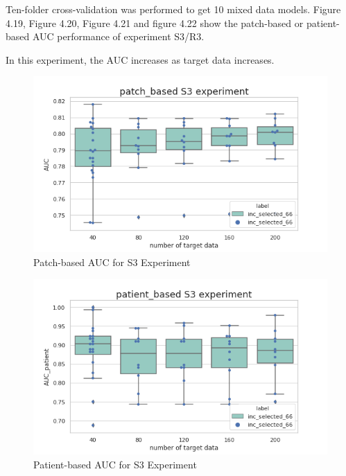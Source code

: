 Ten-folder cross-validation was performed to get 10 mixed data models.
Figure 4.19, Figure 4.20, Figure 4.21 and figure 4.22 show the patch-based or patient-based AUC performance of experiment S3/R3. 

In this experiment, the AUC increases as target data increases.


\begin{figure}[H]
    \hfil
    \begin{minipage}[t]{0.9\textwidth}
        \includegraphics[width=\textwidth]{fig/S3_num_patch.png}
        \caption{\label{fig:parallel1}Patch-based AUC for S3 Experiment}
    \end{minipage}
    \hfil
\end{figure}
\begin{figure}[H]
    \hfil
    \begin{minipage}[t]{0.9\textwidth}
        \includegraphics[width=\textwidth]{fig/S3_num_patient.png}
        \caption{\label{fig:parallel1}Patient-based AUC for S3 Experiment}
    \end{minipage}
    \hfil
\end{figure}
